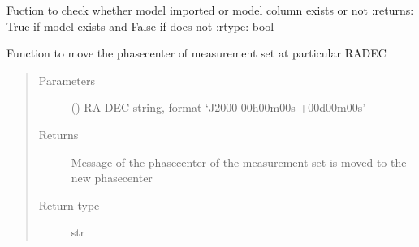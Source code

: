 \documentclass[letterpaper,10pt,english]{sphinxmanual}
\begin{document}
\begin{fulllineitems}
\begin{fulllineitems}
\begin{quote}
\begin{description}
\begin{itemize}
\end{itemize}


\end{description}\end{quote}

\end{fulllineitems}


\begin{fulllineitems}
\label{\detokenize{paircars:paircars.access_ms.AccessMS.model_imported}}
\sphinxAtStartPar
Fuction to check whether model imported or model column exists or not
:returns: True if model exists and False if does not
:rtype: bool

\end{fulllineitems}


\begin{fulllineitems}
\label{\detokenize{paircars:paircars.access_ms.AccessMS.move_phasecenter_to_source}}
\sphinxAtStartPar
Function to move the phasecenter of measurement set at particular RA\sphinxhyphen{}DEC
\begin{quote}\begin{description}
\item[{Parameters}] \leavevmode
\sphinxAtStartPar
{} () \textendash{} RA DEC string, format ‘J2000 00h00m00s +00d00m00s’

\item[{Returns}] \leavevmode
\sphinxAtStartPar
Message of the phasecenter of the measurement set is moved to the new phasecenter

\item[{Return type}] \leavevmode
\sphinxAtStartPar
str

\end{description}\end{quote}


\end{fulllineitems}
\end{fulllineitems}
\end{document}
